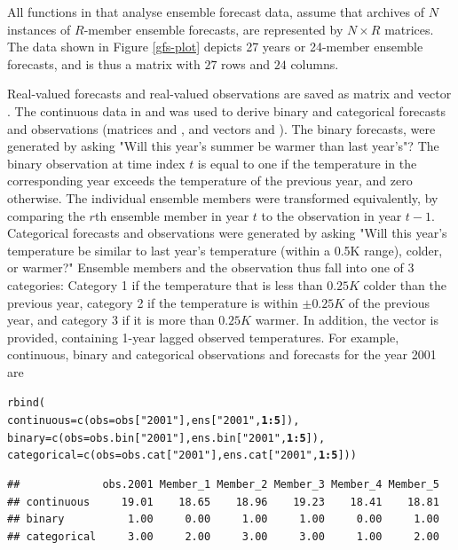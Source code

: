 \documentclass[article]{jss}\usepackage[]{graphicx}\usepackage[]{color}
\makeatletter
\newcommand{\hlnum}[1]{\textcolor[rgb]{0.502,0,0.502}{\textbf{#1}}}%
\newcommand{\hlstr}[1]{\textcolor[rgb]{0.651,0.522,0}{#1}}%
\newcommand{\hlopt}[1]{\textcolor[rgb]{1,0,0.502}{\textbf{#1}}}%
\newcommand{\hlstd}[1]{\textcolor[rgb]{0,0,0}{#1}}%
\newcommand{\hlkwc}[1]{\textcolor[rgb]{0,0.502,0.753}{#1}}%
\newcommand{\hlkwd}[1]{\textcolor[rgb]{0,0.267,0.4}{#1}}%
\newenvironment{kframe}{%
 \def\at@end@of@kframe{}%
 \ifinner\ifhmode%
  \def\at@end@of@kframe{\end{minipage}}%
  \begin{minipage}{\columnwidth}%
 \fi\fi%
 \def\FrameCommand##1{\hskip\@totalleftmargin \hskip-\fboxsep
 \colorbox{shadecolor}{##1}\hskip-\fboxsep
     \hskip-\linewidth \hskip-\@totalleftmargin \hskip\columnwidth}%
 \MakeFramed {\advance\hsize-\width
   \@totalleftmargin\z@ \linewidth\hsize
   \@setminipage}}%
 {\par\unskip\endMakeFramed%
 \at@end@of@kframe}
\newenvironment{knitrout}{}{} %
\makeatother
\begin{document}
All functions in  that analyse ensemble forecast data, assume that archives of $N$ instances of $R$-member ensemble forecasts, are represented by $N\times R$ matrices.
The data shown in Figure \ref{gfs-plot} depicts 27 years or 24-member ensemble forecasts, and is thus a  matrix with $27$ rows and $24$ columns.


Real-valued forecasts and real-valued observations are saved as  matrix  and  vector . 
The continuous data in  and  was used to derive binary and categorical forecasts and observations (matrices  and , and vectors  and ).
The binary forecasts, were generated by asking "Will this year's summer be warmer than last year's"?
The binary observation at time index $t$ is equal to one if the temperature in the corresponding year exceeds the temperature of the previous year, and zero otherwise.
The individual ensemble members were transformed equivalently, by comparing the $r$th ensemble member in year $t$ to the observation in year $t-1$.
Categorical forecasts and observations were generated by asking "Will this year's temperature be similar to last year's temperature (within a 0.5K range), colder, or warmer?"
Ensemble members and the observation thus fall into one of 3 categories: Category 1 if the temperature that is less than $0.25K$ colder than the previous year, category 2 if the temperature is within $\pm 0.25K$ of the previous year, and category 3 if it is more than $0.25K$ warmer.
In addition, the vector  is provided, containing 1-year lagged observed temperatures.
For example, continuous, binary and categorical observations and forecasts for the year 2001 are 

\begin{knitrout}
\color{fgcolor}\begin{kframe}
\begin{alltt}
\hlkwd{rbind}\hlstd{(}
\hlkwc{continuous} \hlstd{=} \hlkwd{c}\hlstd{(}\hlkwc{obs}\hlstd{=obs[}\hlstr{"2001"}\hlstd{], ens[}\hlstr{"2001"}\hlstd{,} \hlnum{1}\hlopt{:}\hlnum{5}\hlstd{]),}
\hlkwc{binary}     \hlstd{=} \hlkwd{c}\hlstd{(}\hlkwc{obs}\hlstd{=obs.bin[}\hlstr{"2001"}\hlstd{], ens.bin[}\hlstr{"2001"}\hlstd{,} \hlnum{1}\hlopt{:}\hlnum{5}\hlstd{]),}
\hlkwc{categorical} \hlstd{=} \hlkwd{c}\hlstd{(}\hlkwc{obs}\hlstd{=obs.cat[}\hlstr{"2001"}\hlstd{], ens.cat[}\hlstr{"2001"}\hlstd{,} \hlnum{1}\hlopt{:}\hlnum{5}\hlstd{]))}
\end{alltt}
\begin{verbatim}
##             obs.2001 Member_1 Member_2 Member_3 Member_4 Member_5
## continuous     19.01    18.65    18.96    19.23    18.41    18.81
## binary          1.00     0.00     1.00     1.00     0.00     1.00
## categorical     3.00     2.00     3.00     3.00     1.00     2.00
\end{verbatim}
\end{kframe}
\end{knitrout}
\end{document}
